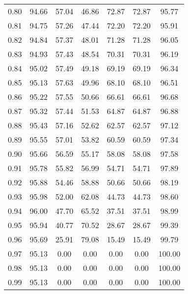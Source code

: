 \begin{tabular}{|c|c|c|c|c|c|c|}
      0.80 &     94.66 &     57.04 &      46.86 &   72.87 &      72.87 &         95.77 \\
      0.81 &     94.75 &     57.26 &      47.44 &   72.20 &      72.20 &         95.91 \\
      0.82 &     94.84 &     57.37 &      48.01 &   71.28 &      71.28 &         96.05 \\
      0.83 &     94.93 &     57.43 &      48.54 &   70.31 &      70.31 &         96.19 \\
      0.84 &     95.02 &     57.49 &      49.18 &   69.19 &      69.19 &         96.34 \\
      0.85 &     95.13 &     57.63 &      49.96 &   68.10 &      68.10 &         96.51 \\
      0.86 &     95.22 &     57.55 &      50.66 &   66.61 &      66.61 &         96.68 \\
      0.87 &     95.32 &     57.44 &      51.53 &   64.87 &      64.87 &         96.88 \\
      0.88 &     95.43 &     57.16 &      52.62 &   62.57 &      62.57 &         97.12 \\
      0.89 &     95.55 &     57.01 &      53.82 &   60.59 &      60.59 &         97.34 \\
      0.90 &     95.66 &     56.59 &      55.17 &   58.08 &      58.08 &         97.58 \\
      0.91 &     95.78 &     55.82 &      56.99 &   54.71 &      54.71 &         97.89 \\
      0.92 &     95.88 &     54.46 &      58.88 &   50.66 &      50.66 &         98.19 \\
      0.93 &     95.98 &     52.00 &      62.08 &   44.73 &      44.73 &         98.60 \\
      0.94 &     96.00 &     47.70 &      65.52 &   37.51 &      37.51 &         98.99 \\
      0.95 &     95.94 &     40.77 &      70.52 &   28.67 &      28.67 &         99.39 \\
      0.96 &     95.69 &     25.91 &      79.08 &   15.49 &      15.49 &         99.79 \\
      0.97 &     95.13 &      0.00 &       0.00 &    0.00 &       0.00 &        100.00 \\
      0.98 &     95.13 &      0.00 &       0.00 &    0.00 &       0.00 &        100.00 \\
      0.99 &     95.13 &      0.00 &       0.00 &    0.00 &       0.00 &        100.00 \\
\bottomrule
\end{tabular}
